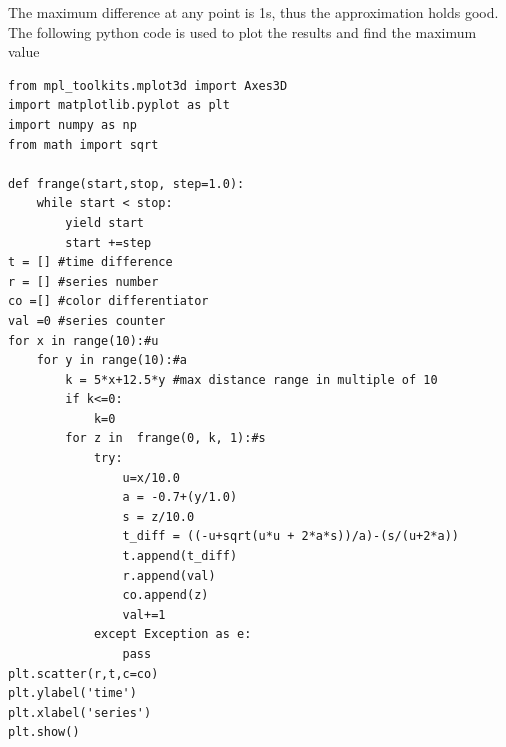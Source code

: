 The maximum difference at any point is 1s, thus the approximation holds good. The following python code is used to plot the results and find the maximum value

\newpage
\begin{lstlisting}
from mpl_toolkits.mplot3d import Axes3D
import matplotlib.pyplot as plt
import numpy as np
from math import sqrt

def frange(start,stop, step=1.0):
	while start < stop:
		yield start
		start +=step
t = [] #time difference
r = [] #series number
co =[] #color differentiator
val =0 #series counter
for x in range(10):#u
	for y in range(10):#a
		k = 5*x+12.5*y #max distance range in multiple of 10
		if k<=0:
			k=0
		for z in  frange(0, k, 1):#s
			try:
				u=x/10.0
				a = -0.7+(y/1.0)
				s = z/10.0
				t_diff = ((-u+sqrt(u*u + 2*a*s))/a)-(s/(u+2*a))
				t.append(t_diff)
				r.append(val)
				co.append(z)
				val+=1
			except Exception as e:
				pass
plt.scatter(r,t,c=co)
plt.ylabel('time')
plt.xlabel('series')
plt.show()


\end{lstlisting}
